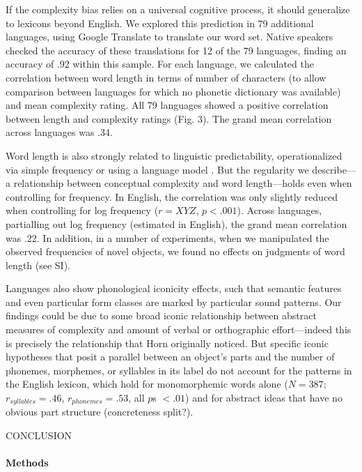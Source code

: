 \documentclass[12pt]{article}
\begin{document}
If the complexity bias relies on a universal cognitive process, it should generalize to lexicons beyond English. We explored this prediction in 79 additional languages, using Google Translate to translate our word set. Native speakers checked the accuracy of these translations for 12 of the 79 languages, finding an accuracy of .92 within this sample. For each language, we calculated the correlation between word length in terms of number of characters (to allow comparison between languages for which no phonetic dictionary was available) and mean complexity rating. All 79 languages showed a positive correlation between length and complexity ratings (Fig. 3). The grand mean correlation across languages was .34. 
					
Word length is also strongly related to linguistic predictability, operationalized via simple frequency \cite{zipf1936} or using a language model \cite{piantadosi2011a}. But the regularity we describe---a relationship between conceptual complexity and word length---holds even when controlling for frequency. In English, the correlation was only slightly reduced when controlling for log frequency ($r = XYZ$, $p < .001$).  Across languages, partialling out log frequency (estimated in English), the grand mean correlation was .22. In addition, in a number of experiments, when we manipulated the observed frequencies of novel objects, we found no effects on judgments of word length (see SI). 

Languages also show phonological iconicity effects, such that semantic features \cite{marr} and even particular form classes \cite{farmer2006,} are marked by particular sound patterns. Our findings could be due to some broad iconic relationship between abstract measures of complexity and amount of verbal or orthographic effort---indeed this is precisely the relationship that Horn originally noticed. But specific iconic hypotheses that posit a parallel between an object's parts and the number of phonemes, morphemes, or syllables in its label do not account for the patterns in the English lexicon, which hold for monomorphemic words alone ($N = 387$; $r_{syllables} = .46$, $r_{phonemes} = .53$, all $p$s $< .01$) and for abstract ideas that have no obvious part structure (concreteness split?).

CONCLUSION


\paragraph*{Methods}
\end{document}
